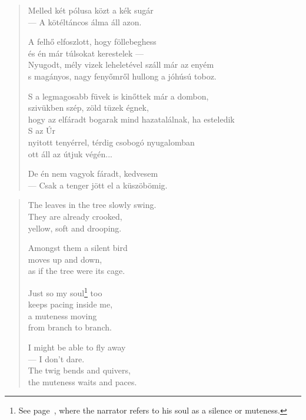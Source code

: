 \documentclass[11pt]{book}
\newcommand*{\centeredornament}{\centerline{\pgfornament[width=6cm]{88}}}
\begin{document}
\newpage

\vspace*{-15mm}
\centeredornament



\begin{verse}
  Melled két pólusa közt a kék sugár \\
  --- A kötéltáncos álma áll azon.

  A felhő elfoszlott, hogy föllebeghess \\
  és én már túlsokat kerestelek --- \\
  Nyugodt, mély vizek leheletével száll már az enyém \\
  s magányos, nagy fenyőmről hullong a jóhúsú toboz.

  S a legmagosabb füvek is kinőttek már a dombon, \\
  szivükben szép, zöld tüzek égnek, \\
  hogy az elfáradt bogarak mind hazatalálnak, ha esteledik \\
  S az Úr \\
  nyitott tenyérrel, térdig csobogó nyugalomban \\
  ott áll az útjuk végén...

  De én nem vagyok fáradt, kedvesem \\
  --- Csak a tenger jött el a küszöbömig.
\end{verse}

\newpage

\vspace*{-15mm}
\centeredornament


\label{the_leaves_in_the_tree}

\begin{verse}
  The leaves in the tree slowly swing. \\
  They are already crooked, \\
  yellow, soft and drooping.

  Amongst them a silent bird \\
  moves up and down, \\
  as if the tree were its cage.

  Just so my soul\footnote{See
  page~\pageref{only_you_should_read_my_poems}, where the narrator
  refers to his soul as a silence or muteness.} too \\
  keeps pacing inside me, \\
  a muteness moving \\
  from branch to branch.

  I might be able to fly away \\
  --- I don't dare. \\
  The twig bends and quivers, \\
  the muteness waits and paces.
\end{verse}
\end{document}
